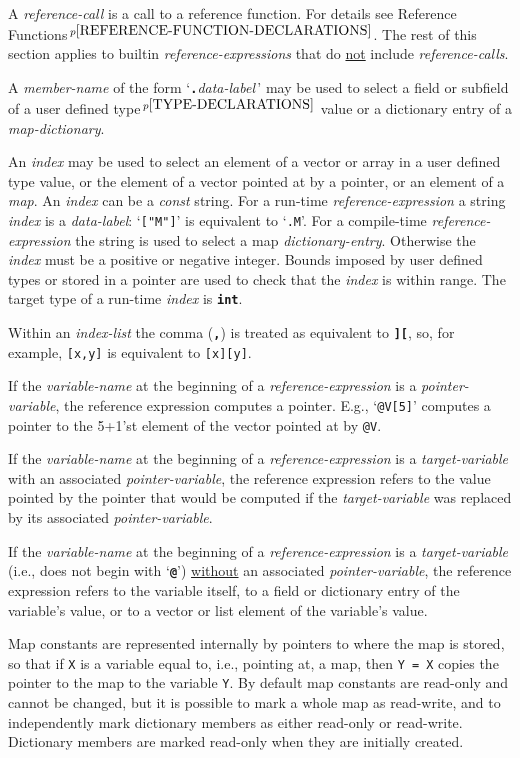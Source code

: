 \documentclass[12pt]{article}
\newcommand{\TT}[1]{{\tt \bfseries #1}}
\newcommand{\pagnote}[1]{$\,^{p\pageref{#1}}$}
\begin{document}
A {\em reference-call} is a call to a reference function.
For details see Reference Functions\pagnote{REFERENCE-FUNCTION-DECLARATIONS}.
The rest of this section applies to builtin {\em reference-expressions}
that do \underline{not} include {\em reference-calls}.

A {\em member-name} of the form `\TT{.}{\em data-label}\,'
may be used to select a field or subfield\label{FIELD-SELECTION}
of a user defined type\pagnote{TYPE-DECLARATIONS} value or
a dictionary entry of a {\em map-dictionary}.

An {\em index} may be used to select an element of a vector
or array in a
user defined type value, or the
element of a vector pointed at by a pointer, or an element
of a {\em map}.  An {\em index} can be a {\em const}
string.  For a run-time {\em reference-expression} a string
{\em index} is a {\em data-label}: `{\tt ["M"]}' is equivalent
to `{\tt .M}'.  For a compile-time {\em reference-expression}
the string is used to select a map {\em dictionary-entry}.
Otherwise the
{\em index} must be a positive or negative integer.  Bounds imposed
by user defined types or stored in a pointer are used to
check that the {\em index} is within range.
The target type of a run-time {\em index} is \TT{int}.


Within an {\em index-list} the comma (\TT{,}) is treated
as equivalent to \TT{][}, so, for example, {\tt [x,y]}
is equivalent to {\tt [x][y]}.

If the {\em variable-name} at the beginning of a {\em reference-expression}
is a {\em pointer-variable}, the reference expression computes a pointer.
E.g., `{\tt @V[5]}' computes a pointer to the 5+1'st element of the
vector pointed at by {\tt @V}.

If the {\em variable-name} at the beginning of a {\em reference-expression}
is a {\em target-variable} with an associated {\em pointer-variable},
the reference expression refers to the value pointed by the pointer
that would be computed if the {\em target-variable} was replaced by
its associated {\em pointer-variable}.

If the {\em variable-name} at the beginning of a {\em reference-expression}
is a {\em target-variable} (i.e., does not begin with `\TT{@}')
\underline{without}
an associated {\em pointer-variable},
the reference expression refers to the variable itself,
to a field or dictionary entry of the variable's value,
or to a vector or list element of the variable's value.

Map constants are represented internally by pointers to where
the map is stored, so that if {\tt X} is a variable equal to,
i.e., pointing at, a map, then {\tt Y = X} copies the pointer
to the map to the variable {\tt Y}.  By default map constants
are read-only and cannot be changed, but it is possible to mark
a whole map as read-write, and to independently mark dictionary members
as either read-only or read-write.
Dictionary members are marked read-only when they are initially created.
\end{document}
